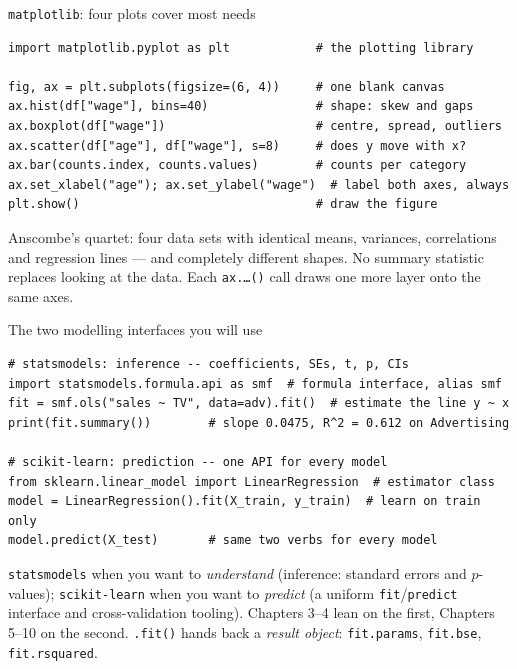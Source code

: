 \documentclass[aspectratio=169,11pt]{beamer}
\begin{document}
\begin{frame}[fragile]{\texttt{matplotlib}: four plots cover most needs}
\begin{lstlisting}
import matplotlib.pyplot as plt            # the plotting library

fig, ax = plt.subplots(figsize=(6, 4))     # one blank canvas
ax.hist(df["wage"], bins=40)               # shape: skew and gaps
ax.boxplot(df["wage"])                     # centre, spread, outliers
ax.scatter(df["age"], df["wage"], s=8)     # does y move with x?
ax.bar(counts.index, counts.values)        # counts per category
ax.set_xlabel("age"); ax.set_ylabel("wage")  # label both axes, always
plt.show()                                 # draw the figure
\end{lstlisting}
  \begin{takeaway}
    Anscombe's quartet: four data sets with identical means, variances,
    correlations and regression lines --- and completely different shapes.
    No summary statistic replaces looking at the data. Each
    \texttt{ax.\dots()} call draws one more layer onto the same axes.
  \end{takeaway}
\end{frame}

\begin{frame}[fragile]{The two modelling interfaces you will use}
\begin{lstlisting}
# statsmodels: inference -- coefficients, SEs, t, p, CIs
import statsmodels.formula.api as smf  # formula interface, alias smf
fit = smf.ols("sales ~ TV", data=adv).fit()  # estimate the line y ~ x
print(fit.summary())        # slope 0.0475, R^2 = 0.612 on Advertising

# scikit-learn: prediction -- one API for every model
from sklearn.linear_model import LinearRegression  # estimator class
model = LinearRegression().fit(X_train, y_train)  # learn on train only
model.predict(X_test)       # same two verbs for every model
\end{lstlisting}
  \begin{takeaway}
    \texttt{statsmodels} when you want to \emph{understand} (inference:
    standard errors and $p$-values); \texttt{scikit-learn} when you want to
    \emph{predict} (a uniform \texttt{fit}/\texttt{predict} interface and
    cross-validation tooling). Chapters 3--4 lean on the first,
    Chapters 5--10 on the second. \texttt{.fit()} hands back a
    \emph{result object}: \texttt{fit.params}, \texttt{fit.bse},
    \texttt{fit.rsquared}.
  \end{takeaway}
\end{frame}
\end{document}
